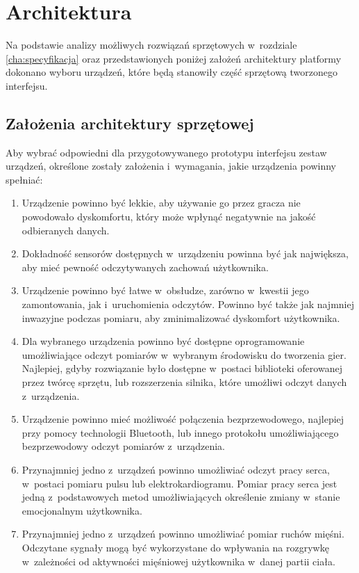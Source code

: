 \chapter{Architektura}
\label{cha:architektura}
Na podstawie analizy możliwych rozwiązań sprzętowych w~rozdziale \ref{cha:specyfikacja} oraz przedstawionych poniżej założeń architektury platformy dokonano wyboru urządzeń, które będą stanowiły część sprzętową tworzonego interfejsu.

\section{Założenia architektury sprzętowej}
Aby wybrać odpowiedni dla przygotowywanego prototypu interfejsu zestaw urządzeń, określone zostały założenia i~wymagania, jakie urządzenia powinny spełniać:
\begin{enumerate}
\item Urządzenie powinno być lekkie, aby używanie go przez gracza nie powodowało dyskomfortu, który może wpłynąć negatywnie na jakość odbieranych danych.
\item Dokładność sensorów dostępnych w~urządzeniu powinna być jak największa, aby mieć pewność odczytywanych zachowań użytkownika.
\item Urządzenie powinno być łatwe w~obsłudze, zarówno w~kwestii jego zamontowania, jak i~uruchomienia odczytów. Powinno być także jak najmniej inwazyjne podczas pomiaru, aby zminimalizować dyskomfort użytkownika.
\item Dla wybranego urządzenia powinno być dostępne oprogramowanie umożliwiające odczyt pomiarów w~wybranym środowisku do tworzenia gier. Najlepiej, gdyby rozwiązanie było dostępne w~postaci biblioteki oferowanej przez twórcę sprzętu, lub rozszerzenia silnika, które umożliwi odczyt danych z~urządzenia.
\item Urządzenie powinno mieć możliwość połączenia bezprzewodowego, najlepiej przy pomocy technologii Bluetooth, lub innego protokołu umożliwiającego bezprzewodowy odczyt pomiarów z~urządzenia.
\item Przynajmniej jedno z~urządzeń powinno umożliwiać odczyt pracy serca, w~postaci pomiaru pulsu lub elektrokardiogramu. Pomiar pracy serca jest jedną z~podstawowych metod umożliwiających określenie zmiany w~stanie emocjonalnym użytkownika.
\item Przynajmniej jedno z~urządzeń powinno umożliwiać pomiar ruchów mięśni. Odczytane sygnały mogą być wykorzystane do wpływania na rozgrywkę w~zależności od aktywności mięśniowej użytkownika w~danej partii ciała.
\end{enumerate}


